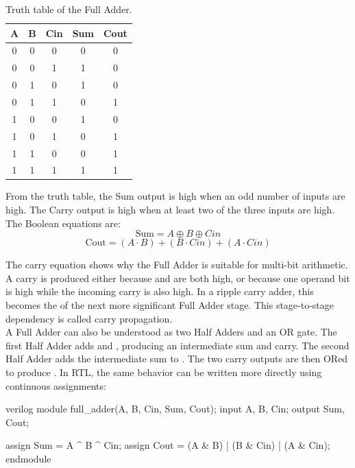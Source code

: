 \begin{table}[H]
\centering
\renewcommand{\arraystretch}{1.2}
\begin{tabular}{|c|c|c|c|c|}
\hline
\textbf{A} & \textbf{B} & \textbf{Cin} & \textbf{Sum} & \textbf{Cout} \\
\hline
0 & 0 & 0 & 0 & 0 \\
\hline
0 & 0 & 1 & 1 & 0 \\
\hline
0 & 1 & 0 & 1 & 0 \\
\hline
0 & 1 & 1 & 0 & 1 \\
\hline
1 & 0 & 0 & 1 & 0 \\
\hline
1 & 0 & 1 & 0 & 1 \\
\hline
1 & 1 & 0 & 0 & 1 \\
\hline
1 & 1 & 1 & 1 & 1 \\
\hline
\end{tabular}
\caption{Truth table of the Full Adder.}
\label{tab:full_adder_truth}
\end{table}

\noindent From the truth table, the Sum output is high when an odd number of inputs are high. The
Carry output is high when at least two of the three inputs are high. The Boolean equations are:
\[
\text{Sum} = A \oplus B \oplus Cin
\]
\[
\text{Cout} = (A \cdot B) + (B \cdot Cin) + (A \cdot Cin)
\]

\noindent The carry equation shows why the Full Adder is suitable for multi-bit arithmetic. A carry
is produced either because  and  are both high, or because one operand
bit is high while the incoming carry is also high. In a ripple carry adder, this
 becomes the  of the next more significant Full Adder stage. This
stage-to-stage dependency is called carry propagation.\\


\noindent A Full Adder can also be understood as two Half Adders and an OR gate. The first Half Adder
adds  and , producing an intermediate sum and carry. The second Half
Adder adds the intermediate sum to . The two carry outputs are then ORed to produce
. In RTL, the same behavior can be written more directly using continuous
assignments:

\begin{codeblock}{verilog}
module full_adder(A, B, Cin, Sum, Cout);
    input A, B, Cin;
    output Sum, Cout;

    assign Sum = A ^ B ^ Cin;
    assign Cout = (A & B) | (B & Cin) | (A & Cin);
endmodule
\end{codeblock}


